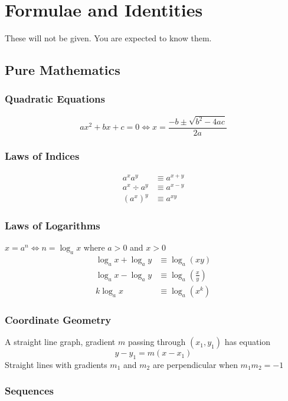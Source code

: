 \chapter{Formulae and Identities}

These will not be given. You are expected to know them.

\section{Pure Mathematics}
\subsection{Quadratic Equations}
\[ax^2+bx+c=0 \iff  x=\frac{-b\pm\sqrt{b^2-4ac}}{2a}\]

\subsection{Laws of Indices} 
\begin{align*} 
    a^xa^y &\equiv a^{x+y}\\
    a^x \div a^y &\equiv a^{x-y}\\
(a^x)^y &\equiv a^{xy}
\end{align*}

\subsection{Laws of Logarithms}
\(
    x = a^n \iff n = \log_ax
\) where \(a>0\) and \(x>0\)
\begin{align*}
    \log_ax + \log_ay &\equiv \log_a(xy) \\
    \log_ax - \log_ay &\equiv \log_a(\frac{x}{y}) \\
    k\log_ax &\equiv \log_a(x^k)
\end{align*}

\subsection{Coordinate Geometry}

A straight line graph, gradient \(m\) passing through \( (x_1, y_1) \) has equation
\[
    y-y_1 = m(x-x_1)
\]
\noindent
Straight lines with gradients \(m_1\) and \(m_2\) are perpendicular when  \( m_1m_2=-1 \)

\subsection{Sequences}

